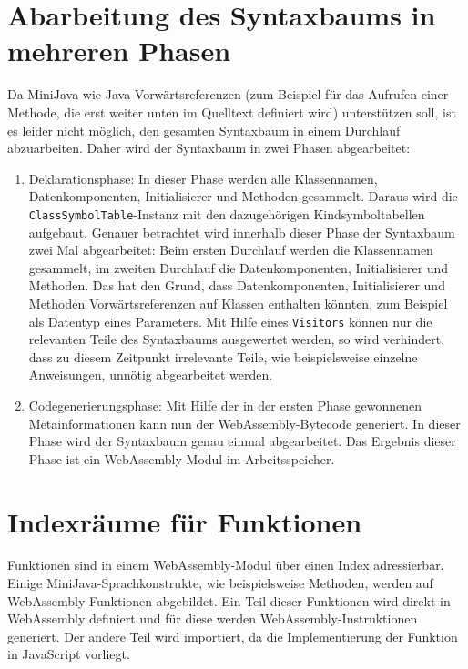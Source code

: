 \section{Abarbeitung des Syntaxbaums in mehreren Phasen}

Da MiniJava wie Java Vorwärtsreferenzen (zum Beispiel für das Aufrufen einer Methode, die erst weiter unten im Quelltext definiert wird) unterstützen soll, ist es leider nicht möglich, den gesamten Syntaxbaum in einem Durchlauf abzuarbeiten. Daher wird der Syntaxbaum in zwei Phasen abgearbeitet:

\begin{enumerate}
    \item Deklarationsphase: In dieser Phase werden alle Klassennamen, Datenkomponenten, Initialisierer und Methoden gesammelt. Daraus wird die \lstinline{ClassSymbolTable}-Instanz mit den dazugehörigen Kindsymboltabellen aufgebaut. Genauer betrachtet wird innerhalb dieser Phase der Syntaxbaum zwei Mal abgearbeitet: Beim ersten Durchlauf werden die Klassennamen gesammelt, im zweiten Durchlauf die Datenkomponenten, Initialisierer und Methoden. Das hat den Grund, dass Datenkomponenten, Initialisierer und Methoden Vorwärtsreferenzen auf Klassen enthalten könnten, zum Beispiel als Datentyp eines Parameters. Mit Hilfe eines \lstinline{Visitors} können nur die relevanten Teile des Syntaxbaums ausgewertet werden, so wird verhindert, dass zu diesem Zeitpunkt irrelevante Teile, wie beispielsweise einzelne Anweisungen, unnötig abgearbeitet werden.
    \item Codegenerierungsphase: Mit Hilfe der in der ersten Phase gewonnenen Metainformationen kann nun der WebAssembly-Bytecode generiert. In dieser Phase wird der Syntaxbaum genau einmal abgearbeitet. Das Ergebnis dieser Phase ist ein WebAssembly-Modul im Arbeitsspeicher.
\end{enumerate}

\section{Indexräume für Funktionen}

Funktionen sind in einem WebAssembly-Modul über einen Index adressierbar. Einige MiniJava-Sprachkonstrukte, wie beispielsweise Methoden, werden auf WebAssembly-Funktionen abgebildet. Ein Teil dieser Funktionen wird direkt in WebAssembly definiert und für diese werden WebAssembly-Instruktionen generiert. Der andere Teil wird importiert, da die Implementierung der Funktion in JavaScript vorliegt.

